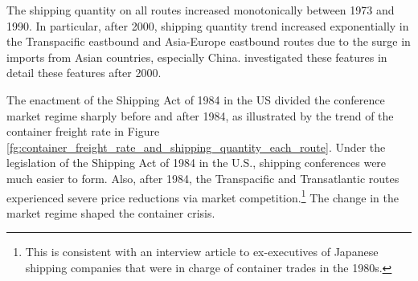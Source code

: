 \documentclass[11pt]{article}
\begin{document}
The shipping quantity on all routes increased monotonically between 1973 and 1990. In particular, after 2000, shipping quantity trend increased exponentially in the Transpacific eastbound and Asia-Europe eastbound routes due to the surge in imports from Asian countries, especially China. \cite{jeon2022learning} investigated these features in detail these features after 2000. 

The enactment of the Shipping Act of 1984 in the US divided the conference market regime sharply before and after 1984, as illustrated by the trend of the container freight rate in Figure \ref{fg:container_freight_rate_and_shipping_quantity_each_route}. Under the legislation of the Shipping Act of 1984 in the U.S., shipping conferences were much easier to form. Also, after 1984, the Transpacific and Transatlantic routes experienced severe price reductions via market competition.\footnote{This is consistent with an interview article to ex-executives of Japanese shipping companies \citep{JapanMaritimeDaily2006} that were in charge of container trades in the 1980s.} The change in the market regime shaped the container crisis.
\end{document}
